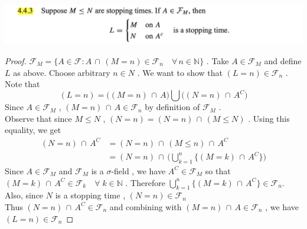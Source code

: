 \documentclass[12pt, A4]{article}
\newcommand{\N}{\mathbb{N}}
\newcommand{\F}{\mathcal{F}}
\newcommand{\intersect}{\,\cap\,}
\newcommand{\foranyn}{\quad \forall \, n\in \N}
\begin{document}
\includegraphics[width=17cm]{Exer4.4.3.png}
\begin{proof}
    $\F_M=\{A\in \F : A\intersect (M=n)\in \F_n \foranyn\}$ . Take $A\in \F_M$ and define $L$ as above. Choose arbitrary $n\in N$ . We want to show that $(L=n)\in \F_n$ . Note that $$(L=n)=\big((M=n)\intersect A\big)\bigcup \big((N=n)\intersect A^C\big)$$
    Since $A\in \F_M$ , $(M=n)\intersect A\in \F_n$ by definition of $\F_M$ . \\ Observe that since $M\leq N$ , $(N=n)=(N=n)\intersect (M\leq N)$ . Using this equality, we get
    \begin{align*}
        (N=n)\intersect A^C&= (N=n)\intersect (M\leq n) \intersect A^C \\
        &= (N=n) \intersect \Big(\bigcup_{k=1}^n \{(M=k)\intersect A^C \}\Big)
    \end{align*}
    Since $A\in \F_M$ and $\F_M$ is a $\sigma$-field , we have $A^C\in \F_M$ so that $(M=k)\intersect A^C\in \F_k\quad \forall\; k\in \N$ . Therefore $\bigcup_{k=1}^n \{(M=k)\intersect A^C \}\in \F_n$. Also, since $N$ is a stopping time , $(N=n)\in \F_n$ \\ Thus $(N=n)\intersect A^C\in \F_n$ and combining with $(M=n)\intersect A\in \F_n$ , we have $(L=n)\in \F_n$
\end{proof}
\clearpage
\end{document}
